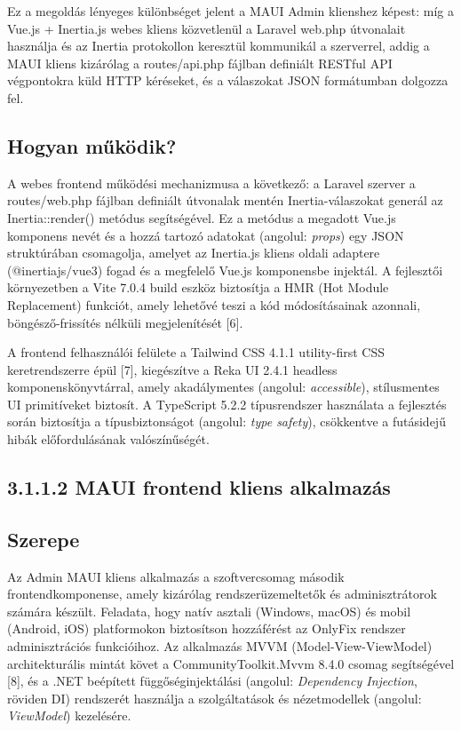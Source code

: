 Ez a megoldás lényeges különbséget jelent a MAUI Admin klienshez képest: míg a Vue.js + Inertia.js webes kliens közvetlenül a Laravel web.php útvonalait használja és az Inertia protokollon keresztül kommunikál a szerverrel, addig a MAUI kliens kizárólag a routes/api.php fájlban definiált RESTful API végpontokra küld HTTP kéréseket, és a válaszokat JSON formátumban dolgozza fel.

\subsection{Hogyan működik?}\label{hogyan-mux171kuxf6dik}

A webes frontend működési mechanizmusa a következő: a Laravel szerver a routes/web.php fájlban definiált útvonalak mentén Inertia-válaszokat generál az Inertia::render() metódus segítségével. Ez a metódus a megadott Vue.js komponens nevét és a hozzá tartozó adatokat (angolul: \emph{props}) egy JSON struktúrában csomagolja, amelyet az Inertia.js kliens oldali adaptere (@inertiajs/vue3) fogad és a megfelelő Vue.js komponensbe injektál. A fejlesztői környezetben a Vite 7.0.4 build eszköz biztosítja a HMR (Hot Module Replacement) funkciót, amely lehetővé teszi a kód módosításainak azonnali, böngésző-frissítés nélküli megjelenítését {[}6{]}.

A frontend felhasználói felülete a Tailwind CSS 4.1.1 utility-first CSS keretrendszerre épül {[}7{]}, kiegészítve a Reka UI 2.4.1 headless komponenskönyvtárral, amely akadálymentes (angolul: \emph{accessible}), stílusmentes UI primitíveket biztosít. A TypeScript 5.2.2 típusrendszer használata a fejlesztés során biztosítja a típusbiztonságot (angolul: \emph{type safety}), csökkentve a futásidejű hibák előfordulásának valószínűségét.

\subsection{3.1.1.2 MAUI frontend kliens alkalmazás}\label{maui-frontend-kliens-alkalmazuxe1s}

\subsection{Szerepe}\label{szerepe}

Az Admin MAUI kliens alkalmazás a szoftvercsomag második frontendkomponense, amely kizárólag rendszerüzemeltetők és adminisztrátorok számára készült. Feladata, hogy natív asztali (Windows, macOS) és mobil (Android, iOS) platformokon biztosítson hozzáférést az OnlyFix rendszer adminisztrációs funkcióihoz. Az alkalmazás MVVM (Model-View-ViewModel) architekturális mintát követ a CommunityToolkit.Mvvm 8.4.0 csomag segítségével {[}8{]}, és a .NET beépített függőséginjektálási (angolul: \emph{Dependency Injection}, röviden DI) rendszerét használja a szolgáltatások és nézetmodellek (angolul: \emph{ViewModel}) kezelésére.

